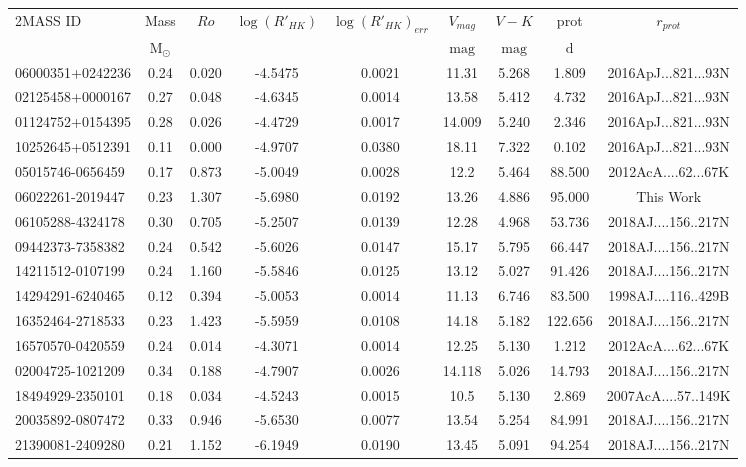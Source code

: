 \begin{tabular}{lcccccccc}
\hline
2MASS ID & Mass & $Ro$ & $\log(R'_{HK})$ & $\log(R'_{HK})_{err}$ & $V_{mag}$ & $V-K$ & prot & $r_{prot}$\\
 & $\mathrm{M_{\odot}}$ &  &  &  & $\mathrm{mag}$ & $\mathrm{mag}$ & $\mathrm{d}$ &   \\
\hline
\hline
06000351+0242236 & 0.24 & 0.020 & -4.5475 & 0.0021 & 11.31 & 5.268 & 1.809 & 2016ApJ...821...93N  \\
02125458+0000167 & 0.27 & 0.048 & -4.6345 & 0.0014 & 13.58 & 5.412 & 4.732 & 2016ApJ...821...93N  \\
01124752+0154395 & 0.28 & 0.026 & -4.4729 & 0.0017 & 14.009 & 5.240 & 2.346 & 2016ApJ...821...93N  \\
10252645+0512391 & 0.11 & 0.000 & -4.9707 & 0.0380 & 18.11 & 7.322 & 0.102 & 2016ApJ...821...93N  \\
05015746-0656459 & 0.17 & 0.873 & -5.0049 & 0.0028 & 12.2 & 5.464 & 88.500 & 2012AcA....62...67K  \\
06022261-2019447 & 0.23 & 1.307 & -5.6980 & 0.0192 & 13.26 & 4.886 & 95.000 & This Work  \\
06105288-4324178 & 0.30 & 0.705 & -5.2507 & 0.0139 & 12.28 & 4.968 & 53.736 & 2018AJ....156..217N  \\
09442373-7358382 & 0.24 & 0.542 & -5.6026 & 0.0147 & 15.17 & 5.795 & 66.447 & 2018AJ....156..217N  \\
14211512-0107199 & 0.24 & 1.160 & -5.5846 & 0.0125 & 13.12 & 5.027 & 91.426 & 2018AJ....156..217N  \\
14294291-6240465 & 0.12 & 0.394 & -5.0053 & 0.0014 & 11.13 & 6.746 & 83.500 & 1998AJ....116..429B  \\
16352464-2718533 & 0.23 & 1.423 & -5.5959 & 0.0108 & 14.18 & 5.182 & 122.656 & 2018AJ....156..217N  \\
16570570-0420559 & 0.24 & 0.014 & -4.3071 & 0.0014 & 12.25 & 5.130 & 1.212 & 2012AcA....62...67K  \\
02004725-1021209 & 0.34 & 0.188 & -4.7907 & 0.0026 & 14.118 & 5.026 & 14.793 & 2018AJ....156..217N  \\
18494929-2350101 & 0.18 & 0.034 & -4.5243 & 0.0015 & 10.5 & 5.130 & 2.869 & 2007AcA....57..149K  \\
20035892-0807472 & 0.33 & 0.946 & -5.6530 & 0.0077 & 13.54 & 5.254 & 84.991 & 2018AJ....156..217N  \\
21390081-2409280 & 0.21 & 1.152 & -6.1949 & 0.0190 & 13.45 & 5.091 & 94.254 & 2018AJ....156..217N  \\

\end{tabular}

